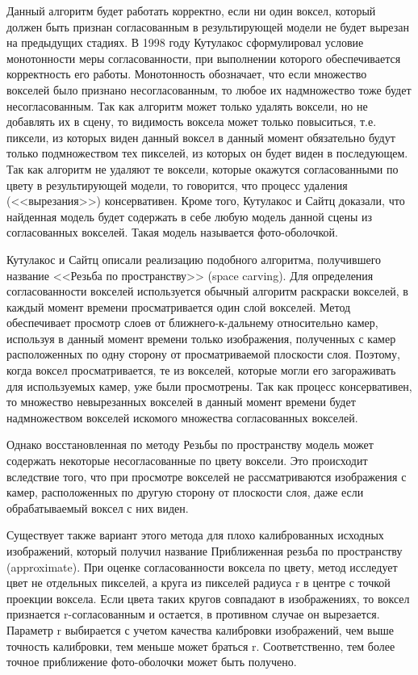 Данный алгоритм будет работать корректно, если ни один воксел, который должен быть признан согласованным в результирующей модели не будет вырезан на предыдущих стадиях. В 1998 году Кутулакос сформулировал условие монотонности меры согласованности, при выполнении которого обеспечивается корректность его работы. Монотонность обозначает, что если множество вокселей было признано несогласованным, то любое их надмножество тоже будет несогласованным. Так как алгоритм может только удалять воксели, но не добавлять их в сцену, то видимость воксела может только повыситься, т.е. пиксели, из которых виден данный воксел в данный момент обязательно будут только подмножеством тех пикселей, из которых он будет виден в последующем. Так как алгоритм не удаляют те воксели, которые окажутся согласованными по цвету в результирующей модели, то говорится, что процесс удаления (<<вырезания>>) консервативен. Кроме того, Кутулакос и Сайтц доказали, что найденная модель будет содержать в себе любую модель данной сцены из согласованных вокселей. Такая модель называется фото-оболочкой.

Кутулакос и Сайтц описали реализацию подобного алгоритма, получившего название <<Резьба по пространству>> (space carving). Для определения согласованности вокселей используется обычный алгоритм раскраски вокселей, в каждый момент времени просматривается один слой вокселей. Метод обеспечивает просмотр слоев от ближнего-к-дальнему относительно камер, используя в данный момент времени только изображения, полученных с камер расположенных по одну сторону от просматриваемой плоскости слоя. Поэтому, когда воксел просматривается, те из вокселей, которые могли его загораживать для используемых камер, уже были просмотрены. Так как процесс консервативен, то множество невырезанных вокселей в данный момент времени будет надмножеством вокселей искомого множества согласованных вокселей.

Однако восстановленная по методу Резьбы по пространству модель может содержать некоторые несогласованные по цвету воксели. Это происходит вследствие того, что при просмотре вокселей не рассматриваются изображения с камер, расположенных по другую сторону от плоскости слоя, даже если обрабатываемый воксел с них виден.

Существует также вариант этого метода для плохо калиброванных исходных изображений, который получил название Приближенная резьба по пространству (approximate). При оценке согласованности воксела по цвету, метод исследует цвет не отдельных пикселей, а круга из пикселей радиуса r в центре с точкой проекции воксела. Если цвета таких кругов совпадают в изображениях, то воксел признается r-согласованным и остается, в противном случае он вырезается. Параметр r выбирается с учетом качества калибровки изображений, чем выше точность калибровки, тем меньше может браться r. Соответственно, тем более точное приближение фото-оболочки может быть получено.

